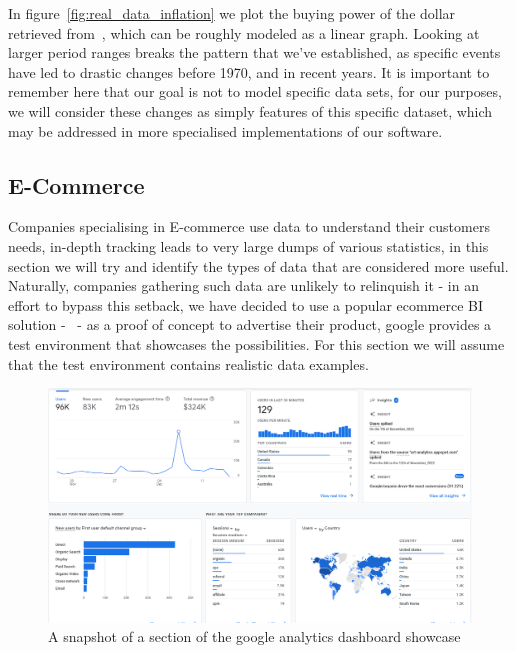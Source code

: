 In figure~\ref{fig:real_data_inflation} we plot the buying power of the dollar retrieved
from~\cite{officialdataCPIInflationUS}, which can be roughly modeled as a linear graph.
Looking at larger period ranges breaks the pattern that we've established, as specific events have led to drastic
changes before 1970, and in recent years.
It is important to remember here that our goal is not to model specific data sets, for our purposes, we will consider
these changes as simply features of this specific dataset, which may be addressed in more specialised implementations of
our software.

\subsection{E-Commerce}

Companies specialising in E-commerce use data to understand their customers needs, in-depth tracking leads to very large
dumps of various statistics, in this section we will try and identify the types of data that are considered more useful.
Naturally, companies gathering such data are unlikely to relinquish it - in an effort to bypass this setback, we have
decided to use a popular ecommerce BI solution -~\cite{GoogleAnalytics} - as a proof of concept to advertise their
product, google provides a test environment that showcases the possibilities.
For this section we will assume that the test environment contains realistic data examples.

\begin{figure}[H]
    \centering
    \includegraphics[width=12cm]{figures/real_data_examples/google_analytics_dashboard}
    \caption{A snapshot of a section of the google analytics dashboard showcase}
    \label{fig:google_analytics_dashboard}
\end{figure}


